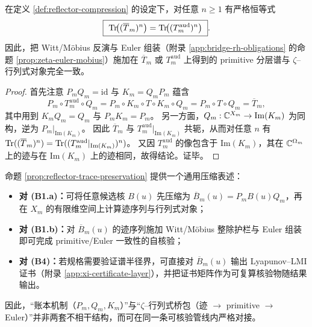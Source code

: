 \begin{proposition}\label{prop:reflector-trace-preservation}
在定义 \ref{def:reflector-compression} 的设定下，对任意 $n\ge 1$ 有严格恒等式
$$
\boxed{\ \mathrm{Tr}\!\bigl((\overline T_m)^n\bigr)=\mathrm{Tr}\!\bigl((T_m^{\mathrm{aud}})^n\bigr)\ }.
$$
因此，把 Witt/Möbius 反演与 Euler 组装（附录 \ref{app:bridge-rh-obligations} 的命题 \ref{prop:zeta-euler-mobius}）施加在 $\overline T_m$ 或 $T_m^{\mathrm{aud}}$ 上得到的 primitive 分层谱与 $\zeta$–行列式对象完全一致。
\end{proposition}
\begin{proof}
首先注意 $P_mQ_m=\mathrm{id}$ 与 $K_m=Q_mP_m$ 蕴含
$$
P_m\circ T_m^{\mathrm{aud}}\circ Q_m
=P_m\circ K_m\circ T\circ K_m\circ Q_m
=P_m\circ T\circ Q_m
=\overline T_m,
$$
其中用到 $K_mQ_m=Q_m$ 与 $P_mK_m=P_m$。
另一方面，$Q_m:\mathbb{C}^{X_m}\to \mathrm{Im}(K_m)$ 为同构，逆为 $P_m|_{\mathrm{Im}(K_m)}$。
因此 $\overline T_m$ 与 $T_m^{\mathrm{aud}}|_{\mathrm{Im}(K_m)}$ 共轭，从而对任意 $n$ 有
$
\mathrm{Tr}((\overline T_m)^n)=\mathrm{Tr}((T_m^{\mathrm{aud}}|_{\mathrm{Im}(K_m)})^n)
$。
又因 $T_m^{\mathrm{aud}}$ 的像包含于 $\mathrm{Im}(K_m)$，其在 $\mathbb{C}^{\Omega_m}$ 上的迹与在 $\mathrm{Im}(K_m)$ 上的迹相同，故得结论。证毕。
\end{proof}

\begin{remark}\label{rem:reflector-to-bridge}
命题 \ref{prop:reflector-trace-preservation} 提供一个通用压缩表述：
\begin{itemize}
  \item \textbf{对 (B1.a)：}可将任意候选核 $B(u)$ 先压缩为 $\overline B_m(u)=P_mB(u)Q_m$，再在 $X_m$ 的有限维空间上计算迹序列与行列式对象；
  \item \textbf{对 (B1.b)：}对 $\overline B_m(u)$ 的迹序列施加 Witt/Möbius 整除护栏与 Euler 组装即可完成 primitive/Euler 一致性的自核验；
  \item \textbf{对 (B4)：}若规格需要验证谱半径界，可直接对 $\overline B_m(u)$ 输出 Lyapunov--LMI 证书（附录 \ref{app:xi-certificate-layer}），并把证书矩阵作为可复算核验物随结果输出。
\end{itemize}
因此，“账本机制（$P_m,Q_m,K_m$）”与“$\zeta$–行列式桥包（迹 $\to$ primitive $\to$ Euler）”并非两套不相干结构，而可在同一条可核验管线内严格对接。
\end{remark}


